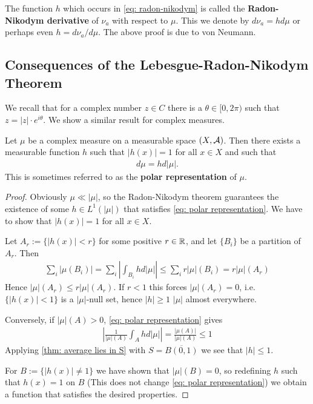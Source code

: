 The function $h$ which occurs in \eqref{eq: radon-nikodym} is called the \textbf{Radon-Nikodym derivative} of $\nu_{a}$ with respect to $\mu$. This we denote by $d\nu_{a}=hd\mu$ or perhaps even $h=d\nu_{a}/ d\mu$. The above proof is due to von Neumann.


\subsection{Consequences of the Lebesgue-Radon-Nikodym Theorem}

We recall that for a complex number $z\in C$ there is a $\theta\in [0,2\pi)$ such that $z=|z|\cdot e^{i\theta}$. We show a similar result for complex measures.

\begin{theorem}\label{thm: polar representation}
Let $\mu$ be a complex measure on a measurable space $(X, \mathcal{A})$. Then there exists a measurable function $h$ such that $|h(x)|=1$ for all $x\in X$ and such that
\begin{align}
	d\mu=hd|\mu|. \label{eq: polar representation}
\end{align}
This is sometimes referred to as the \textbf{polar representation} of $\mu$.
\end{theorem}
\begin{proof}
Obviously $\mu \ll |\mu|$, so the Radon-Nikodym theorem guarantees the existence of some $h\in L^{1}(|\mu|)$ that satisfies \eqref{eq: polar representation}. We have to show that $|h(x)|=1$ for all $x\in X$.

Let $A_{r}:=\{|h(x)|<r\}$ for some positive $r\in \mathbb{R}$, and let $\{B_{i}\}$ be a partition of $A_{r}$. Then
\begin{align*}
	\sum_{i}|\mu(B_{i})|=\sum_{i}\left| \int_{B_{i}}hd|\mu| \right| \le \sum_{i} r|\mu|(B_{i})=r|\mu|(A_{r})
\end{align*}
Hence $|\mu|(A_{r})\le r|\mu|(A_{r})$. If $r<1$ this forces $|\mu|(A_{r})=0$, i.e. $\{|h(x)|<1\}$ is a $|\mu|$-null set, hence $|h|\ge 1$ $|\mu|$ almost everywhere.

Conversely, if $|\mu|(A)>0$, \eqref{eq: polar representation} gives
\begin{align*}
	\left| \frac{1}{|\mu|(A)} \int_{A}hd|\mu| \right|=\frac{|\mu(A)|}{|\mu|(A)}\le 1
\end{align*}
Applying \cref{thm: average lies in S} with $S=\overline{B(0,1)}$ we see that $|h|\le 1$.

For $B:=\{|h(x)|\neq 1\}$ we have shown that $|\mu|(B)=0$, so redefining $h$ such that $h(x)=1$ on $B$ (This does not change \eqref{eq: polar representation}) we obtain a function that satisfies the desired properties.
\end{proof}

